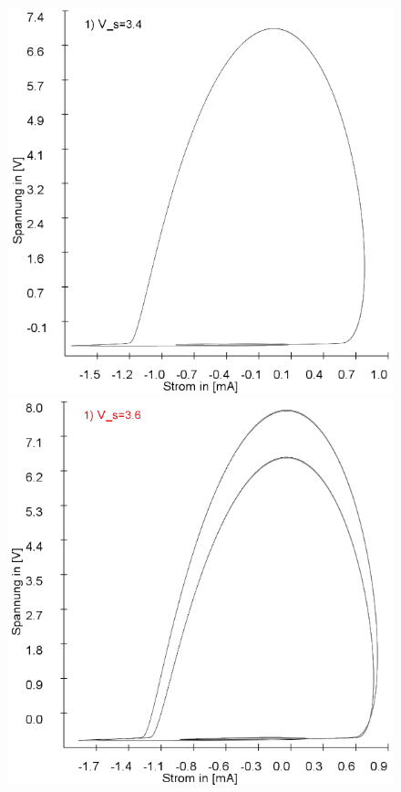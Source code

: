 \documentclass[12pt,a4paper]{article}
\begin{document}
\begin{figure}[!htbp]
\centering
\includegraphics[scale=0.20]{schwing-euler-nach2500k-weitere100k-3,4V}
\includegraphics[scale=0.20]{schwing-euler-nach2500k-weitere100k-3,6V}

\end{figure}
\end{document}

